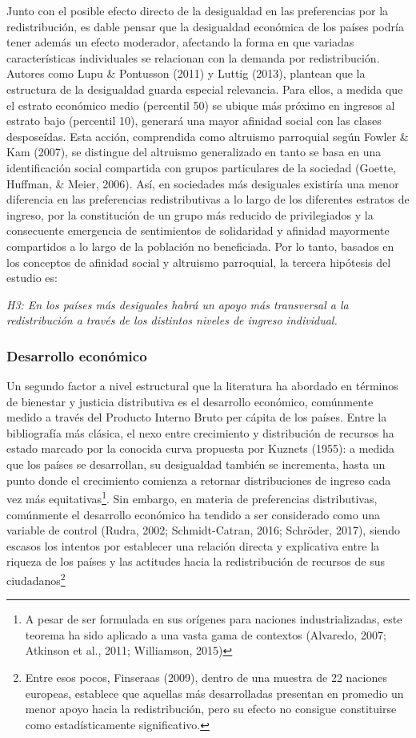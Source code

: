 \documentclass[12pt,letterpaper]{article}
\begin{document}
Junto con el posible efecto directo de la desigualdad en las preferencias por la redistribución, es dable pensar que la desigualdad económica de los países podría tener además un efecto moderador, afectando la forma en que variadas características individuales se relacionan con la demanda por redistribución. Autores como Lupu \& Pontusson (2011) y Luttig (2013), plantean que la estructura de la desigualdad guarda especial relevancia. Para ellos, a medida que el estrato económico medio (percentil 50) se ubique más próximo en ingresos al estrato bajo (percentil 10), generará una mayor afinidad social con las clases desposeídas. Esta acción, comprendida como altruismo parroquial según Fowler \& Kam (2007), se distingue del altruismo generalizado en tanto se basa en una identificación social compartida con grupos particulares de la sociedad (Goette, Huffman, \& Meier, 2006). Así, en sociedades más desiguales existiría una menor diferencia en las preferencias redistributivas a lo largo de los diferentes estratos de ingreso, por la constitución de un grupo más reducido de privilegiados y la consecuente emergencia de sentimientos de solidaridad y afinidad mayormente compartidos a lo largo de la población no beneficiada. Por lo tanto, basados en los conceptos de afinidad social y altruismo parroquial, la tercera hipótesis del estudio es:

\textit{H3: En los países más desiguales habrá un apoyo más transversal a la redistribución a través de los distintos niveles de ingreso individual.}

\subsubsection{Desarrollo económico \label{sec:sub222}}

Un segundo factor a nivel estructural que la literatura ha abordado en términos de bienestar y justicia distributiva es el desarrollo económico, comúnmente medido a través del Producto Interno Bruto per cápita de los países. Entre la bibliografía más clásica, el nexo entre crecimiento y distribución de recursos ha estado marcado por la conocida curva propuesta por Kuznets (1955): a medida que los países se desarrollan, su desigualdad también se incrementa, hasta un punto donde el crecimiento comienza a retornar distribuciones de ingreso cada vez más equitativas\footnote{A pesar de ser formulada en sus orígenes para naciones industrializadas, este teorema ha sido aplicado a una vasta gama de contextos (Alvaredo, 2007; Atkinson et al., 2011; Williamson, 2015)}. Sin embargo, en materia de preferencias distributivas, comúnmente el desarrollo económico ha tendido a ser considerado como una variable de control (Rudra, 2002; Schmidt-Catran, 2016; Schröder, 2017), siendo escasos los intentos por establecer una relación directa y explicativa entre la riqueza de los países y las actitudes hacia la redistribución de recursos de sus ciudadanos\footnote{Entre esos pocos, Finseraas (2009), dentro de una muestra de 22 naciones europeas, establece que aquellas más desarrolladas presentan en promedio un menor apoyo hacia la redistribución, pero su efecto no consigue constituirse como estadísticamente significativo.}\\
\end{document}
